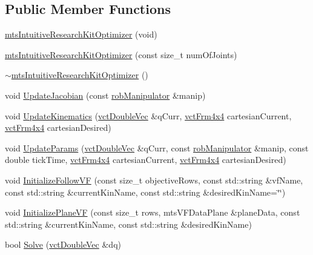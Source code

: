 \subsection*{Public Member Functions}
\begin{DoxyCompactItemize}
\item 
\hyperlink{classmts_intuitive_research_kit_optimizer_af160a886afc7ade0e09a70492774604d}{mts\+Intuitive\+Research\+Kit\+Optimizer} (void)
\item 
\hyperlink{classmts_intuitive_research_kit_optimizer_a1fd1f5d52df0c43a0ed45b2e9147801b}{mts\+Intuitive\+Research\+Kit\+Optimizer} (const size\+\_\+t num\+Of\+Joints)
\item 
\hyperlink{classmts_intuitive_research_kit_optimizer_a6c1bb4177eff53d8dbe8224c591cfe91}{$\sim$mts\+Intuitive\+Research\+Kit\+Optimizer} ()
\item 
void \hyperlink{classmts_intuitive_research_kit_optimizer_a05bdadeaebb6088921f840c84769511c}{Update\+Jacobian} (const \hyperlink{classrob_manipulator}{rob\+Manipulator} \&manip)
\item 
void \hyperlink{classmts_intuitive_research_kit_optimizer_a6b9b58fa536eb466fd511d02ef99d7d2}{Update\+Kinematics} (\hyperlink{vct_dynamic_vector_types_8h_ade4b3068c86fb88f41af2e5187e491c2}{vct\+Double\+Vec} \&q\+Curr, \hyperlink{vct_transformation_types_8h_a33da47f4deb2556b37a69a2c44b29d75}{vct\+Frm4x4} cartesian\+Current, \hyperlink{vct_transformation_types_8h_a33da47f4deb2556b37a69a2c44b29d75}{vct\+Frm4x4} cartesian\+Desired)
\item 
void \hyperlink{classmts_intuitive_research_kit_optimizer_a63904f22f0ee3d20eb683f7576f9923f}{Update\+Params} (\hyperlink{vct_dynamic_vector_types_8h_ade4b3068c86fb88f41af2e5187e491c2}{vct\+Double\+Vec} \&q\+Curr, const \hyperlink{classrob_manipulator}{rob\+Manipulator} \&manip, const double tick\+Time, \hyperlink{vct_transformation_types_8h_a33da47f4deb2556b37a69a2c44b29d75}{vct\+Frm4x4} cartesian\+Current, \hyperlink{vct_transformation_types_8h_a33da47f4deb2556b37a69a2c44b29d75}{vct\+Frm4x4} cartesian\+Desired)
\item 
void \hyperlink{classmts_intuitive_research_kit_optimizer_aef0de374260f326d4c49f7f8598d9eda}{Initialize\+Follow\+V\+F} (const size\+\_\+t objective\+Rows, const std\+::string \&vf\+Name, const std\+::string \&current\+Kin\+Name, const std\+::string \&desired\+Kin\+Name=\char`\"{}\char`\"{})
\item 
void \hyperlink{classmts_intuitive_research_kit_optimizer_a6928383d7ecd2e6e1fcd0281ff7e37c6}{Initialize\+Plane\+V\+F} (const size\+\_\+t rows, mts\+V\+F\+Data\+Plane \&plane\+Data, const std\+::string \&current\+Kin\+Name, const std\+::string \&desired\+Kin\+Name)
\item 
bool \hyperlink{classmts_intuitive_research_kit_optimizer_a91dcdb8e78fe389d008ee470d3e163b9}{Solve} (\hyperlink{vct_dynamic_vector_types_8h_ade4b3068c86fb88f41af2e5187e491c2}{vct\+Double\+Vec} \&dq)
\end{DoxyCompactItemize}

